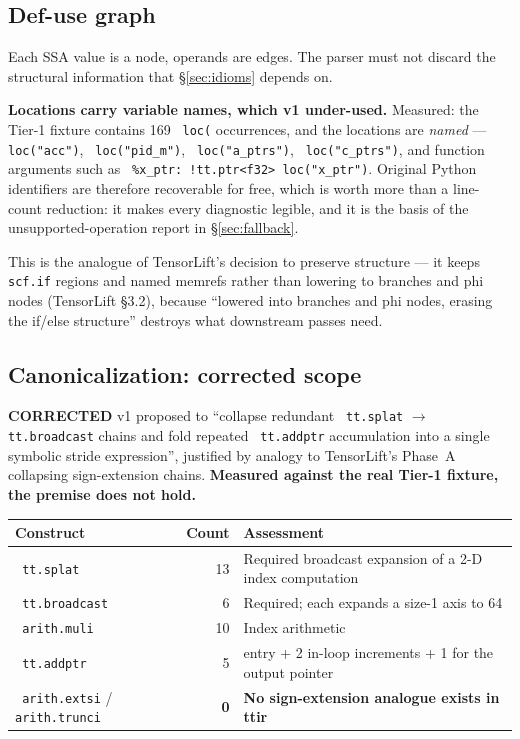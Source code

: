 \documentclass[11pt,a4paper]{article}
\newcommand{\code}[1]{\texttt{\small\hyphenchar\font=45 #1}}
\newcommand{\falsified}{\textbf{\textcolor{red!75!black}{CORRECTED}}}
\begin{document}
\subsection{Def-use graph}

Each SSA value is a node, operands are edges. The parser must not discard the structural information that
\S\ref{sec:idioms} depends on.

\noindent\textbf{Locations carry variable names, which v1 under-used.} Measured: the Tier-1 fixture contains
169 \code{loc(} occurrences, and the locations are \emph{named} --- \code{loc("acc")}, \code{loc("pid\_m")},
\code{loc("a\_ptrs")}, \code{loc("c\_ptrs")}, and function arguments such as
\code{\%x\_ptr: !tt.ptr<f32> loc("x\_ptr")}. Original Python identifiers are therefore recoverable for free,
which is worth more than a line-count reduction: it makes every diagnostic legible, and it is the basis of
the unsupported-operation report in \S\ref{sec:fallback}.

\noindent This is the analogue of TensorLift's decision to preserve structure --- it keeps \code{scf.if}
regions and named memrefs rather than lowering to branches and phi nodes (TensorLift \S3.2), because
``lowered into branches and phi nodes, erasing the if/else structure'' destroys what downstream passes need.

\subsection{Canonicalization: corrected scope}\label{sec:canon}

\falsified{} v1 proposed to ``collapse redundant \code{tt.splat} $\rightarrow$ \code{tt.broadcast} chains
and fold repeated \code{tt.addptr} accumulation into a single symbolic stride expression'', justified by
analogy to TensorLift's Phase~A collapsing sign-extension chains. \textbf{Measured against the real Tier-1
fixture, the premise does not hold.}

\begin{center}
\begin{tabularx}{\textwidth}{@{}l r >{\raggedright\arraybackslash}X@{}}
\toprule
\textbf{Construct} & \textbf{Count} & \textbf{Assessment} \\
\midrule
\code{tt.splat} & 13 & Required broadcast expansion of a 2-D index computation \\
\code{tt.broadcast} & 6 & Required; each expands a size-1 axis to 64 \\
\code{arith.muli} & 10 & Index arithmetic \\
\code{tt.addptr} & 5 & 2 entry + 2 in-loop increments + 1 for the output pointer \\
\code{arith.extsi} / \code{arith.trunci} & \textbf{0} & \textbf{No sign-extension analogue exists in ttir} \\
\bottomrule
\end{tabularx}
\end{center}
\end{document}
